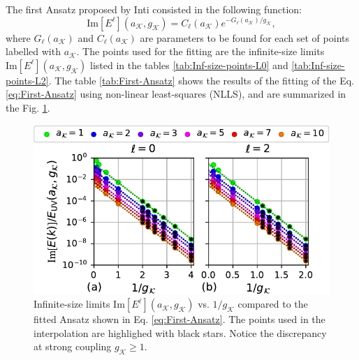 \documentclass[english,aps,prd,nofootinbib,twocolumn]{revtex4-1}
\begin{document}
The first Ansatz proposed by Inti consisted in the following function: 
\begin{equation}
\label{eq:First-Ansatz}
\mathrm{Im}[E^{\ell}](a_{\mathcal{K}},g_{\mathcal{K}}) = C_{\ell}(a_{\mathcal{K}})
e^{-G_{\ell}(a_{\mathcal{K}})/g_{\mathcal{K}}},
\end{equation}
where $G_{\ell}(a_{\mathcal{K}})$ and $C_{\ell}(a_{\mathcal{K}})$ are parameters to be found for each set of points labelled with $a_{\mathcal{K}}$. The points used for the fitting are the infinite-size limits $\mathrm{Im}[E^{\ell}](a_{\mathcal{K}},g_{\mathcal{K}})$ listed in the tables \ref{tab:Inf-size-points-L0} and \ref{tab:Inf-size-points-L2}. The table \ref{tab:First-Ansatz} shows the results of the fitting of the Eq. \eqref{eq:First-Ansatz} using non-linear least-squares (NLLS), and are summarized in the Fig. \ref{fig:First-Ansatz}. 

\begin{figure}
\centering
\includegraphics[scale=0.6]{./PlotReport/FirstAnsatz}
\caption{Infinite-size limits $\mathrm{Im}[E^{\ell}](a_{\mathcal{K}},g_{\mathcal{K}})$ vs. $1/g_{\mathcal{K}}$ compared to the fitted Ansatz shown in Eq. \eqref{eq:First-Ansatz}. The points used in the interpolation are highlighed with black stars. Notice the discrepancy at strong coupling $g_{\mathcal{K}}\geq 1$.}
\label{fig:First-Ansatz}
\end{figure}
\end{document}
